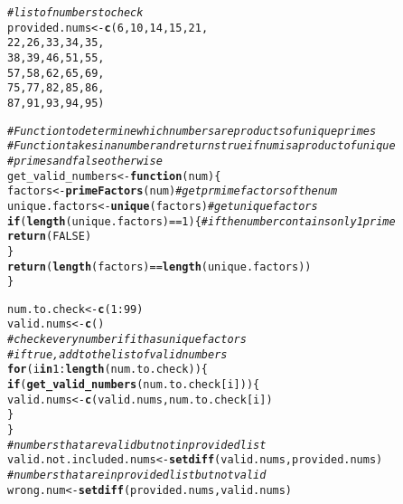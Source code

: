 \documentclass{article}\usepackage[]{graphicx}\usepackage[]{xcolor}
\makeatletter
\newcommand{\hlnum}[1]{\textcolor[rgb]{0.686,0.059,0.569}{#1}}%
\newcommand{\hlcom}[1]{\textcolor[rgb]{0.678,0.584,0.686}{\textit{#1}}}%
\newcommand{\hlopt}[1]{\textcolor[rgb]{0,0,0}{#1}}%
\newcommand{\hldef}[1]{\textcolor[rgb]{0.345,0.345,0.345}{#1}}%
\newcommand{\hlkwa}[1]{\textcolor[rgb]{0.161,0.373,0.58}{\textbf{#1}}}%
\newcommand{\hlkwb}[1]{\textcolor[rgb]{0.69,0.353,0.396}{#1}}%
\newcommand{\hlkwc}[1]{\textcolor[rgb]{0.333,0.667,0.333}{#1}}%
\newcommand{\hlkwd}[1]{\textcolor[rgb]{0.737,0.353,0.396}{\textbf{#1}}}%
\newenvironment{kframe}{%
 \def\at@end@of@kframe{}%
 \ifinner\ifhmode%
  \def\at@end@of@kframe{\end{minipage}}%
  \begin{minipage}{\columnwidth}%
 \fi\fi%
 \def\FrameCommand##1{\hskip\@totalleftmargin \hskip-\fboxsep
 \colorbox{shadecolor}{##1}\hskip-\fboxsep
     \hskip-\linewidth \hskip-\@totalleftmargin \hskip\columnwidth}%
 \MakeFramed {\advance\hsize-\width
   \@totalleftmargin\z@ \linewidth\hsize
   \@setminipage}}%
 {\par\unskip\endMakeFramed%
 \at@end@of@kframe}
\newenvironment{knitrout}{}{} %
\makeatother
\begin{document}
\begin{enumerate}
\begin{knitrout}
\begin{kframe}
\begin{alltt}
\hlcom{#list of numbers to check}
\hldef{provided.nums} \hlkwb{<-} \hlkwd{c}\hldef{(}\hlnum{6}\hldef{,} \hlnum{10}\hldef{,} \hlnum{14}\hldef{,} \hlnum{15}\hldef{,} \hlnum{21}\hldef{,}
                   \hlnum{22}\hldef{,} \hlnum{26}\hldef{,} \hlnum{33}\hldef{,} \hlnum{34}\hldef{,} \hlnum{35}\hldef{,}
                   \hlnum{38}\hldef{,} \hlnum{39}\hldef{,} \hlnum{46}\hldef{,} \hlnum{51}\hldef{,} \hlnum{55}\hldef{,}
                   \hlnum{57}\hldef{,} \hlnum{58}\hldef{,} \hlnum{62}\hldef{,} \hlnum{65}\hldef{,} \hlnum{69}\hldef{,}
                   \hlnum{75}\hldef{,} \hlnum{77}\hldef{,} \hlnum{82}\hldef{,} \hlnum{85}\hldef{,} \hlnum{86}\hldef{,}
                   \hlnum{87}\hldef{,} \hlnum{91}\hldef{,} \hlnum{93}\hldef{,} \hlnum{94}\hldef{,} \hlnum{95}\hldef{)}

\hlcom{#Function to determine which numbers are products of unique primes}
\hlcom{#Function takes in a number and returns true if num is a product of unique}
\hlcom{#primes and false otherwise}
\hldef{get_valid_numbers} \hlkwb{<-} \hlkwa{function}\hldef{(}\hlkwc{num}\hldef{)\{}
  \hldef{factors} \hlkwb{<-} \hlkwd{primeFactors}\hldef{(num)} \hlcom{#get prmime factors of the num}
  \hldef{unique.factors} \hlkwb{<-} \hlkwd{unique}\hldef{(factors)} \hlcom{#get unique factors}
  \hlkwa{if} \hldef{(}\hlkwd{length}\hldef{(unique.factors)} \hlopt{==}\hlnum{1}\hldef{)\{} \hlcom{#if the number contains only 1 prime}
    \hlkwd{return}\hldef{(}\hlnum{FALSE}\hldef{)}
  \hldef{\}}
  \hlkwd{return}\hldef{(}\hlkwd{length}\hldef{(factors)} \hlopt{==} \hlkwd{length}\hldef{(unique.factors))}
\hldef{\}}

\hldef{num.to.check} \hlkwb{<-} \hlkwd{c}\hldef{(}\hlnum{1}\hlopt{:}\hlnum{99}\hldef{)}
\hldef{valid.nums} \hlkwb{<-} \hlkwd{c}\hldef{()}
\hlcom{#check every number if it has unique factors}
\hlcom{#if true, add to the list of valid numbers}
\hlkwa{for} \hldef{(i} \hlkwa{in} \hlnum{1}\hlopt{:}\hlkwd{length}\hldef{(num.to.check))\{}
  \hlkwa{if} \hldef{(}\hlkwd{get_valid_numbers}\hldef{(num.to.check[i]))\{}
    \hldef{valid.nums} \hlkwb{<-} \hlkwd{c}\hldef{(valid.nums, num.to.check[i])}
  \hldef{\}}
\hldef{\}}
\hlcom{#numbers that are valid but not in provided list}
\hldef{valid.not.included.nums} \hlkwb{<-} \hlkwd{setdiff}\hldef{(valid.nums, provided.nums)}
\hlcom{#numbers that are in provided list but not valid}
\hldef{wrong.num} \hlkwb{<-} \hlkwd{setdiff}\hldef{(provided.nums, valid.nums)}


\end{alltt}
\end{kframe}
\end{knitrout}
\end{enumerate}
\end{document}
